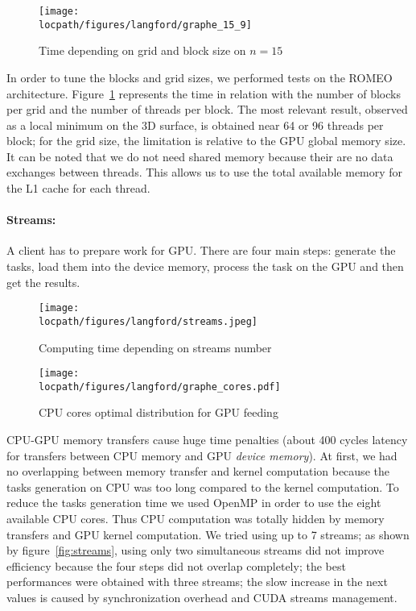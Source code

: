\begin{figure}[t!]
\centering
\texttt{[image: \\locpath/figures/langford/graphe\_15\_9]}
\caption{Time depending on grid and block size on $n=15$}
\label{f7}
\end{figure}

In order to tune the blocks and grid sizes, we performed tests on the ROMEO architecture. 
Figure~\ref{f7} represents the time in relation with the number of blocks per grid and the number of threads per block. 
The most relevant result, observed as a local minimum on the 3D surface, is obtained near 64 or 96 threads per block; for the grid size, the limitation is relative to the GPU global memory size.
It can be noted that we do not need shared memory because their are no data exchanges between threads. 
This allows us to use the total available memory for the L1 cache for each thread.

\paragraph{Streams:}
A client has to prepare work for GPU. There are four main steps: generate the tasks, load them into the device memory, process the task on the GPU and then get the results.

\begin{figure}[t!]
\begin{minipage}[b]{0.48\linewidth}
\centering
\texttt{[image: \\locpath/figures/langford/streams.jpeg]}
\caption{Computing time depending on streams number}
\label{fig:streams}
\end{minipage}
\hfill
\begin{minipage}[b]{0.48\linewidth}
\centering
\texttt{[image: \\locpath/figures/langford/graphe\_cores.pdf]}
\caption{CPU cores optimal distribution for GPU feeding}\label{cores_rep}
\end{minipage}
\end{figure}

CPU-GPU memory transfers cause huge time penalties (about 400 cycles latency for transfers between CPU memory and GPU \emph{device memory}). 
At first, we had no overlapping between memory transfer and kernel computation because the tasks generation on CPU was too long compared to the kernel computation.
To reduce the tasks generation time we used OpenMP in order to use the eight available CPU cores.
Thus CPU computation was totally hidden by memory transfers and GPU kernel computation. We tried using up to 7 streams; as shown by figure~\ref{fig:streams}, using only two simultaneous streams did not improve efficiency because the four steps did not overlap completely; the best performances were obtained with three streams; the slow increase in the next values is caused by synchronization overhead and CUDA streams management.

